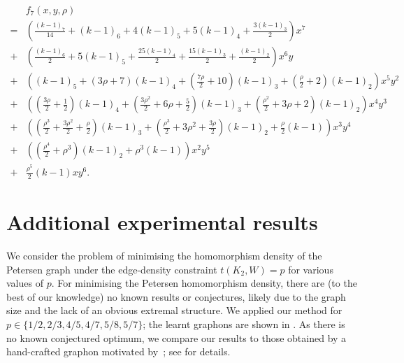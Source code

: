 \documentclass{article}
\theoremstyle{plain}
\theoremstyle{definition}
\theoremstyle{remark}
\begin{document}
\begin{align*}
  &f_7(x, y, \rho) 
  \\
  {} = &\left(\frac{(k-1)_7}{14} + (k-1)_6 + 4 (k-1)_5 + 5(k-1)_4 + \frac{3(k-1)_3}{2}\right) x^7
  \\
  {} + &\left( \frac{(k-1)_6}{2} + 5 (k-1)_5 + \frac{25(k-1)_4}{2} + \frac{15 (k-1)_3}{2} + \frac{(k-1)_2}{2} \right) x^6 y
  \\
  {} + &\left( (k-1)_5 + (3\rho + 7)(k-1)_4 + \left( \frac{7\rho}{2} + 10 \right) (k-1)_3 + \left( \frac{\rho}{2} + 2 \right) (k-1)_2 \right) x^5 y^2
  \\
  {} + &\left( \left( \frac{3 \rho}{2} + \frac{1}{2} \right) (k-1)_4 + \left( \frac{3\rho^2}{2} + 6 \rho + \frac{5}{2} \right)(k-1)_3 + \left( \frac{\rho^2}{2} + 3\rho + 2 \right)(k-1)_2\right) x^4 y^3
  \\
  {} + &\left( \left( \frac{\rho^3}{2} + \frac{3\rho^2}{2} + \frac{\rho}{2} \right)(k-1)_3 + \left( \frac{\rho^3}{2} + 3\rho^2 + \frac{3\rho}{2} \right)(k-1)_2 + \frac{\rho}{2} (k-1) \right) x^3 y^4
  \\
  {} + &\left( \left( \frac{\rho^4}{2} + \rho^3 \right) (k-1)_2 + \rho^3 (k-1) \right) x^2 y^5
  \\
  {} + & \frac{\rho^5}{2} (k-1) x y^6.
\end{align*}

\section{Additional experimental results}
\label{sec:addexperiments}

We consider the problem of minimising the homomorphism density of the Petersen graph under the edge-density constraint $t(K_2, W) = p$ for various values of $p$.
For minimising the Petersen homomorphism density, there are (to the best of our knowledge) no known results or conjectures, likely due to the graph size and the lack of an obvious extremal structure.
We applied our method for $p \in \{1/2, 2/3, 4/5, 4/7, 5/8, 5/7\}$; the learnt graphons are shown in .
As there is no known conjectured optimum, we compare our results to those obtained by a hand-crafted graphon motivated by~\citet{razborov2008minimal}; see  for details.
\end{document}
